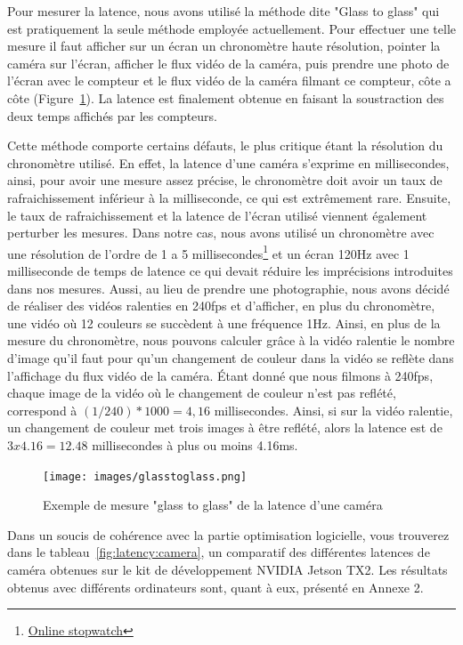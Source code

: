Pour mesurer la latence, nous avons utilisé la méthode dite "Glass to glass" qui est pratiquement la seule méthode employée actuellement. Pour effectuer une telle mesure il faut afficher sur un écran un chronomètre haute résolution, pointer la caméra sur l'écran, afficher le flux vidéo de la caméra, puis prendre une photo de l'écran avec le compteur et le flux vidéo de la caméra filmant ce compteur, côte a côte (Figure~\ref{fig:latency:glasstoglass}). La latence est finalement obtenue en faisant la soustraction des deux temps affichés par les compteurs. 

Cette méthode comporte certains défauts, le plus critique étant la résolution du chronomètre utilisé. En effet, la latence d'une caméra s'exprime en millisecondes, ainsi, pour avoir une mesure assez précise, le chronomètre doit avoir un taux de rafraichissement inférieur à la milliseconde, ce qui est extrêmement rare. Ensuite, le taux de rafraichissement et la latence de l'écran utilisé viennent également perturber les mesures. Dans notre cas, nous avons utilisé un chronomètre avec une résolution de l'ordre de 1 a 5 millisecondes\footnote{\href{https://stopwatch.onlineclock.net/}{Online stopwatch}} et un écran 120Hz avec 1 milliseconde de temps de latence ce qui devait réduire les imprécisions introduites dans nos mesures. Aussi, au lieu de prendre une photographie, nous avons décidé de réaliser des vidéos ralenties en 240fps et d'afficher, en plus du chronomètre, une vidéo où 12 couleurs se succèdent à une fréquence 1Hz. Ainsi, en plus de la mesure du chronomètre, nous pouvons calculer grâce à la vidéo ralentie le nombre d'image qu'il faut pour qu'un changement de couleur dans la vidéo se reflète dans l'affichage du flux vidéo de la caméra. Étant donné que nous filmons à 240fps, chaque image de la vidéo où le changement de couleur n'est pas reflété, correspond à $(1/240) * 1000 = 4,16$ millisecondes. Ainsi, si sur la vidéo ralentie, un changement de couleur met trois images à être reflété, alors la latence est de $3 x 4.16 = 12.48$ millisecondes à plus ou moins 4.16ms.

\begin{figure}[H]
\centering
\texttt{[image: images/glasstoglass.png]}
\caption{Exemple de mesure "glass to glass" de la latence d'une caméra}
\label{fig:latency:glasstoglass}
\end{figure}

Dans un soucis de cohérence avec la partie optimisation logicielle, vous trouverez dans le tableau~\ref{fig:latency:camera}, un comparatif des différentes latences de caméra obtenues sur le kit de développement NVIDIA Jetson TX2. Les résultats obtenus avec différents ordinateurs sont, quant à eux, présenté en Annexe 2.

